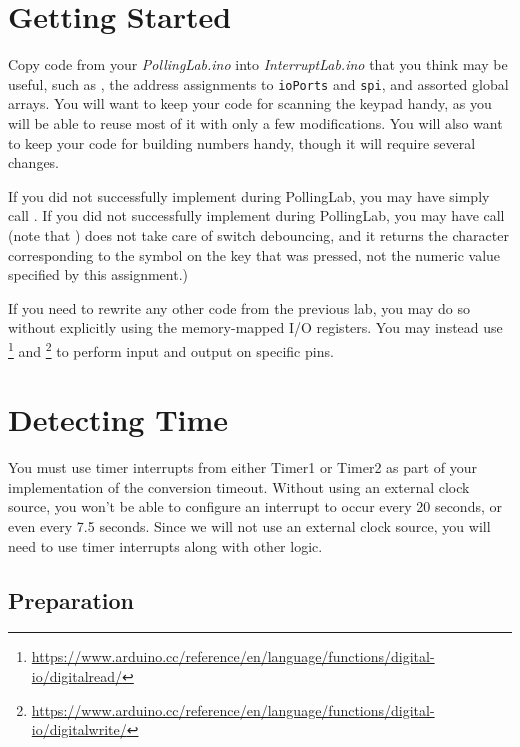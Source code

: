 \section{Getting Started} \label{sec:GettingStarted}

Copy code from your \textit{PollingLab.ino} into \textit{InterruptLab.ino} that
you think may be useful, such as , the address
assignments to \lstinline{ioPorts} and \lstinline{spi}, and assorted global
arrays. You will want to keep your code for scanning the keypad handy, as you
will be able to reuse most of it with only a few modifications. You will also
want to keep your code for building numbers handy, though it will require
several changes.

If you did not successfully implement  during
PollingLab, you may have  simply call
. If you did not successfully
implement  during PollingLab, you may have
 call  (note that
) does not take care of switch debouncing, and it
returns the character corresponding to the symbol on the key that was pressed,
not the numeric value specified by this assignment.)

If you need to rewrite any other code from the previous lab, you may do so
without explicitly using the memory-mapped I/O registers. You may instead use
\footnote{\url{https://www.arduino.cc/reference/en/language/functions/digital-io/digitalread/}}
and \footnote{\url{https://www.arduino.cc/reference/en/language/functions/digital-io/digitalwrite/}}
to perform input and output on specific pins.

\section{Detecting Time}\label{sec:TimerInterrupts}

You must use timer interrupts from either Timer1 or Timer2 as part of your
implementation of the conversion timeout. Without using an external clock source,
you won't be able to configure an interrupt to occur every 20 seconds, or even
every 7.5 seconds. Since we will not use an external clock source, you will need
to use timer interrupts along with other logic.

\subsection{Preparation}

